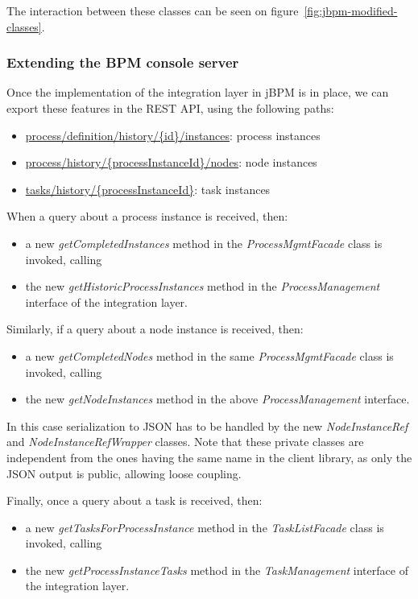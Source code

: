 The interaction between these classes can be seen on figure~\ref{fig:jbpm-modified-classes}.

\subsubsection*{Extending the BPM console server}

Once the implementation of the integration layer in jBPM is in place, we can
export these features in the REST API, using the following paths:

\begin{itemize}
\item \url{process/definition/history/{id}/instances}: process instances
\item \url{process/history/{processInstanceId}/nodes}: node instances
\item \url{tasks/history/{processInstanceId}}: task instances
\end{itemize}

When a query about a process instance is received, then:

\begin{itemize}
\item a new \emph{getCompletedInstances} method in the \emph{ProcessMgmtFacade} class is invoked, calling
\item the new \emph{getHistoricProcessInstances} method in the \emph{ProcessManagement} interface of the integration layer.
\end{itemize}

Similarly, if a query about a node instance is received, then:

\begin{itemize}
\item a new \emph{getCompletedNodes} method in the same \emph{ProcessMgmtFacade} class is invoked, calling
\item the new \emph{getNodeInstances} method in the above \emph{ProcessManagement} interface.
\end{itemize}

In this case serialization to JSON has to be handled by the new
\emph{NodeInstanceRef} and \emph{NodeInstanceRefWrapper} classes. Note that
these private classes are independent from the ones having the same name in the
client library, as only the JSON output is public, allowing loose coupling.

Finally, once a query about a task is received, then:

\begin{itemize}
\item a new \emph{getTasksForProcessInstance} method in the \emph{TaskListFacade} class is invoked, calling
\item the new \emph{getProcessInstanceTasks} method in the \emph{TaskManagement} interface of the integration layer.
\end{itemize}

